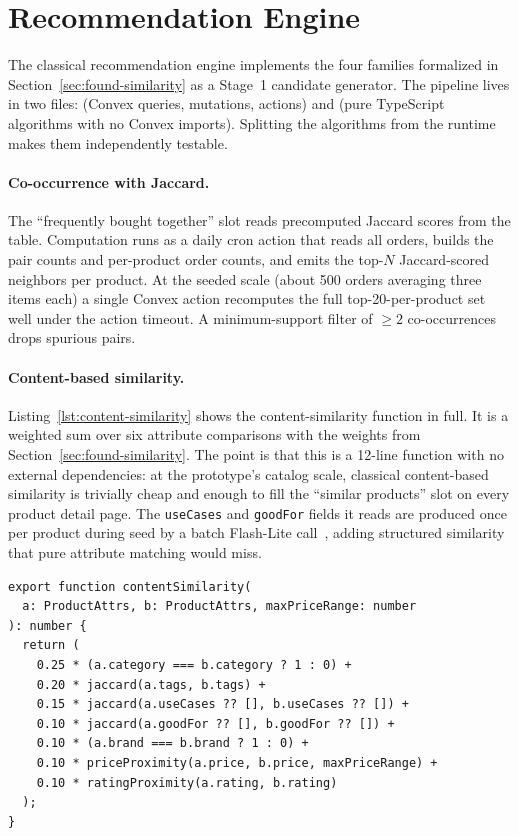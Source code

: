 \section{Recommendation Engine}
\label{sec:sys-recommendations}

The classical recommendation engine implements the four families
formalized in Section~\ref{sec:found-similarity} as a Stage~1
candidate generator. The pipeline lives in two files:
 (Convex queries, mutations,
actions) and  (pure
TypeScript algorithms with no Convex imports). Splitting the
algorithms from the runtime makes them independently testable.

\paragraph{Co-occurrence with Jaccard.} The
``frequently bought together'' slot reads precomputed Jaccard
scores from the  table. Computation
runs as a daily cron action that reads all orders, builds the
pair counts and per-product order counts, and emits the
top-$N$ Jaccard-scored neighbors per product. At the seeded scale
(about 500 orders averaging three items each) a single Convex
action recomputes the full top-20-per-product set well under the
action timeout. A minimum-support filter of $\ge 2$
co-occurrences drops spurious pairs.

\paragraph{Content-based similarity.}
Listing~\ref{lst:content-similarity} shows the content-similarity
function in full. It is a weighted sum over six attribute
comparisons with the weights from
Section~\ref{sec:found-similarity}. The point is that this is a
12-line function with no external dependencies: at the
prototype's catalog scale, classical content-based similarity is
trivially cheap and enough to fill the ``similar products'' slot
on every product detail page. The \texttt{useCases} and
\texttt{goodFor} fields it reads are produced once per product
during seed by a batch Flash-Lite call~\cite{COSMO}, adding
structured similarity that pure attribute matching would miss.

\begin{listing}[ht]
\begin{verbatim}
export function contentSimilarity(
  a: ProductAttrs, b: ProductAttrs, maxPriceRange: number
): number {
  return (
    0.25 * (a.category === b.category ? 1 : 0) +
    0.20 * jaccard(a.tags, b.tags) +
    0.15 * jaccard(a.useCases ?? [], b.useCases ?? []) +
    0.10 * jaccard(a.goodFor ?? [], b.goodFor ?? []) +
    0.10 * (a.brand === b.brand ? 1 : 0) +
    0.10 * priceProximity(a.price, b.price, maxPriceRange) +
    0.10 * ratingProximity(a.rating, b.rating)
  );
}
\end{verbatim}
  \caption{The content-similarity function.}
  \label{lst:content-similarity}
\end{listing}

